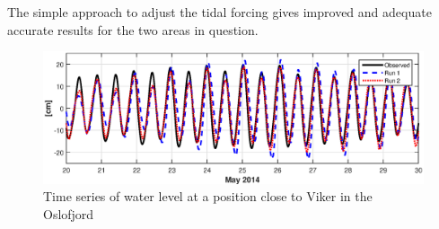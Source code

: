 The simple approach to adjust the tidal forcing gives improved and adequate accurate results for the two areas in question. 



\begin{figure}[!t]
\centering
\includegraphics[width=\textwidth]{fig_Viker_timeseries}
\caption{Time series of water level at a position close to Viker in the Oslofjord}
\label{fig:Viker_timeseries}
\end{figure}




